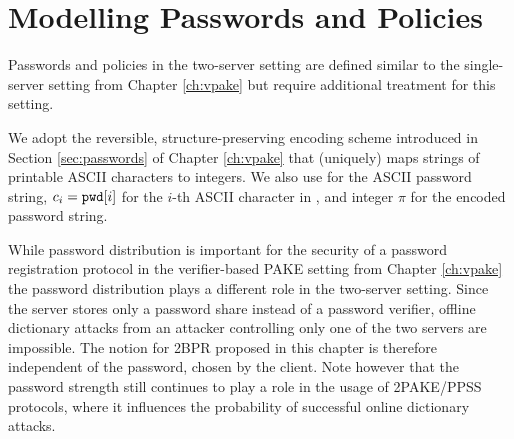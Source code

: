 \section{Modelling Passwords and Policies}
Passwords and policies in the two-server setting are defined similar to the single-server setting from Chapter \ref{ch:vpake} but require additional treatment for this setting.

We adopt the reversible, structure-preserving encoding scheme introduced in Section \ref{sec:passwords} of Chapter \ref{ch:vpake} that (uniquely) maps strings of printable \ac{ASCII} characters to integers.
We also use \pwd for the \ac{ASCII} password string, $c_i=\mathtt{pwd}[i]$ for the $i$-th \ac{ASCII} character in \pwd, and integer $\pi$ for the encoded password string.

\begin{remark}\label{rem:passwords}
While password distribution is important for the security of a password registration protocol in the verifier-based PAKE setting from Chapter \ref{ch:vpake} the password distribution plays a different role in the two-server setting.
Since the server stores only a password share instead of a password verifier, offline dictionary attacks from an attacker controlling only one of the two servers are impossible.
The notion for \ac{2BPR} proposed in this chapter is therefore independent of the password, chosen by the client.
Note however that the password strength still continues to play a role in the usage of \ac{2PAKE}/\ac{PPSS} protocols, where it influences the probability of successful online dictionary attacks.
\end{remark}

